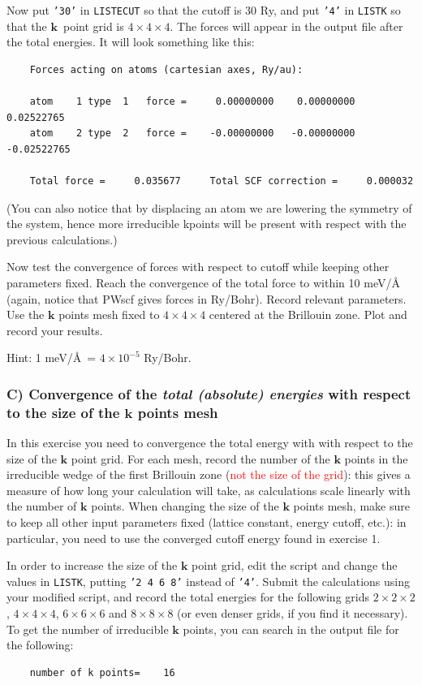 \documentclass[12pt]{article}
\def\red#1{\textcolor{red}{#1}}
\begin{document}
\vspace{2mm}
Now put {\tt '30'} in {\tt LISTECUT} so that the cutoff is 30 Ry, and put {\tt '4'}
in {\tt LISTK} so that the $\mathbf{k}$~point grid is $4 \times 4 \times 4$.
The forces will appear in the output file after the total energies.
It will look something like this:
\begin{verbatim}
    Forces acting on atoms (cartesian axes, Ry/au):

    atom    1 type  1   force =     0.00000000    0.00000000    0.02522765
    atom    2 type  2   force =    -0.00000000   -0.00000000   -0.02522765

    Total force =     0.035677     Total SCF correction =     0.000032
\end{verbatim}
(You can also notice that by displacing an atom we are lowering the symmetry of
the system, hence more irreducible kpoints will be present with respect with the
previous calculations.)

Now test the convergence of forces with respect to cutoff while keeping other
parameters fixed.
Reach the convergence of the total force to within 10 meV/\AA \, (again, notice that PWscf
gives forces in Ry/Bohr).
Record relevant parameters. Use the $\mathbf{k}$ points mesh fixed to
$4 \times 4 \times 4$ centered at the Brillouin zone.
Plot and record your results.

Hint: 1 meV/\AA \, = $4 \times 10^{-5}$ Ry/Bohr.


\vspace{6mm}
\subsubsection*{C) Convergence of the {\it total (absolute) energies} with
respect to the size of the $\mathbf{k}$ points mesh}

In this exercise you need to convergence the total energy with with respect to the
size of the $\mathbf{k}$ point grid.
For each mesh, record the number of the $\mathbf{k}$ points in the irreducible wedge
of the first Brillouin zone (\red{not the size of the grid}): this gives a measure of
how long your calculation will take, as calculations scale linearly with the number of
$\mathbf{k}$ points.
When changing the size of the $\mathbf{k}$ points mesh, make sure to keep all other
input parameters fixed (lattice constant, energy cutoff, etc.): in particular, you
need to use the converged cutoff energy found in exercise 1.

In order to increase the size of the $\mathbf{k}$ point grid, edit the script and change
the values in {\tt LISTK}, putting {\tt '2 4 6 8'} instead of {\tt '4'}.
Submit the calculations using your modified script, and record the total energies for the following grids
$2 \times 2 \times 2$, $4 \times 4 \times 4$, $6 \times 6 \times 6$ and
$8 \times 8 \times 8$ (or even denser grids, if you find it necessary).
To get the number of irreducible $\mathbf{k}$ points, you can search in the output file
for the following:
\begin{verbatim}
    number of k points=    16
\end{verbatim}
\end{document}
